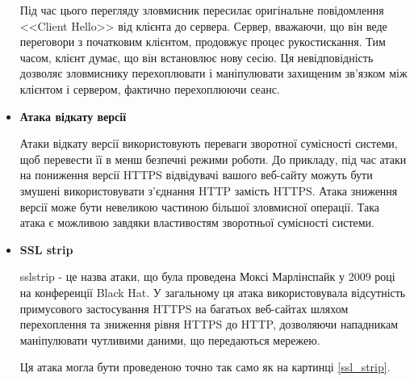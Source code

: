 \begin{itemize}
    Під час цього перегляду зловмисник пересилає оригінальне повідомлення <<Client Hello>> від клієнта до сервера. Сервер, вважаючи, що він веде переговори з початковим клієнтом, продовжує процес рукостискання. Тим часом, клієнт думає, що він встановлює нову сесію. Ця невідповідність дозволяє зловмиснику перехоплювати і маніпулювати захищеним зв'язком між клієнтом і сервером, фактично перехоплюючи сеанс.

    
\item \textbf{Атака відкату версії}

    Атаки відкату версії використовують переваги зворотної сумісності системи, щоб перевести її в менш безпечні режими роботи. До прикладу, під час атаки на пониження версії HTTPS відвідувачі вашого веб-сайту можуть бути змушені використовувати з’єднання HTTP замість HTTPS. Атака зниження версії може бути невеликою частиною більшої зловмисної операції. Така атака є можливою завдяки властивостям зворотньої сумісності системи.


\item \textbf{SSL strip}

    sslstrip - це назва атаки, що була проведена Моксі Марлінспайк у 2009 році на конференції Black Hat. У загальному ця атака використовувала відсутність примусового застосування HTTPS на багатьох веб-сайтах шляхом перехоплення та зниження рівня HTTPS до HTTP, дозволяючи нападникам маніпулювати чутливими даними, що передаються мережею.

    Ця атака могла бути проведеною точно так само як на картинці \ref{ssl_strip}.


\end{itemize}
